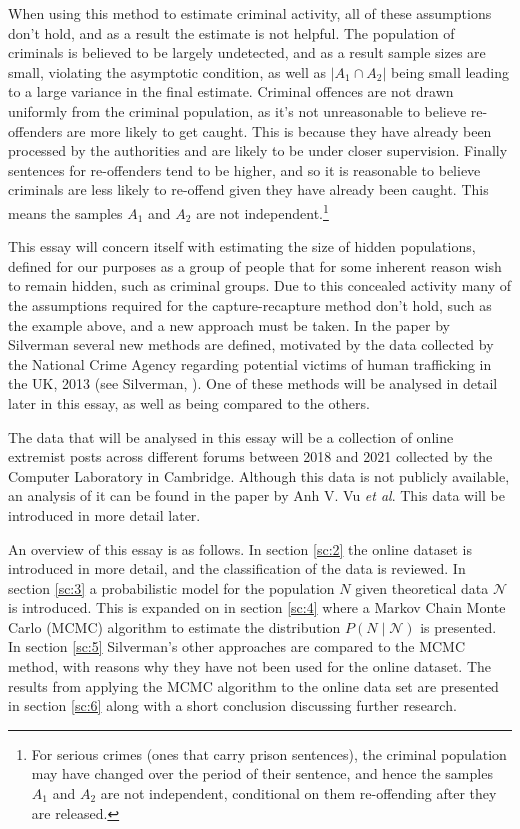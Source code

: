 \documentclass[10pt,a4paper,notitlepage]{article}
\newcommand{\abs}[1]{\lvert#1\rvert}
\begin{document}
When using this method to estimate criminal activity, all of these assumptions don't hold, and as a result the estimate is not helpful. The population of criminals is believed to be largely undetected, and as a result sample sizes are small, violating the asymptotic condition, as well as $\abs{A_{1}\cap A_{2}}$ being small leading to a large variance in the final estimate. Criminal offences are not drawn uniformly from the criminal population, as it's not unreasonable to believe re-offenders are more likely to get caught. This is because they have already been processed by the authorities and are likely to be under closer supervision. Finally sentences for re-offenders tend to be higher, and so it is reasonable to believe criminals are less likely to re-offend given they have already been caught.  This means the samples $A_{1}$ and $A_{2}$ are not independent.\footnote{For serious crimes (ones that carry prison sentences), the criminal population may have changed over the period of their sentence, and hence the samples $A_{1}$ and $A_{2}$ are not independent, conditional on them re-offending after they are released. }

This essay will concern itself with estimating the size of hidden populations, defined for our purposes as a group of people that for some inherent reason wish to remain hidden, such as criminal groups. Due to this concealed activity many of the assumptions required for the capture-recapture method don't hold, such as the example above, and a new approach must be taken. In the paper \cite{Silverman} by Silverman several new methods are defined, motivated by the data collected by the National Crime Agency regarding potential victims of human trafficking in the UK, 2013 (see Silverman, \cite{Silver}). One of these methods will be analysed in detail later in this essay, as well as being compared to the others.



The data that will be analysed in this essay will be a collection of online extremist posts across different forums between 2018 and 2021 collected by the Computer Laboratory in Cambridge. Although this data is not publicly available, an analysis of it can be found in the paper \cite{ExtremeBB} by Anh V. Vu \textit{et al}. This data will be introduced in more detail later. 

An overview of this essay is as follows. In section \ref{sc:2} the online dataset is introduced in more detail, and the classification of the data is reviewed. In section \ref{sc:3} a probabilistic model for the population $N$ given theoretical data $\mathcal{N}$ is introduced. This is expanded on in section \ref{sc:4} where a Markov Chain Monte Carlo (MCMC) algorithm to estimate the distribution $P(N\mid\mathcal{N})$ is presented. In section \ref{sc:5} Silverman's other approaches are compared to the MCMC method, with reasons why they have not been used for the online dataset. The results from applying the MCMC algorithm to the online data set are presented in section \ref{sc:6} along with a short conclusion discussing further research.
\end{document}
